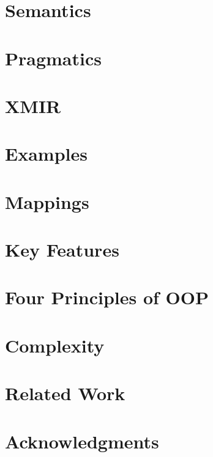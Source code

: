 \documentclass[sigplan,nonacm,natbib=false]{acmart}
\theoremstyle{theorems}
\begin{document}
\section{Semantics}
\label{sec:semantics}


\section{Pragmatics}
\label{sec:pragmatics}


\section{XMIR}
\label{sec:xmir}


\section{Examples}
\label{sec:examples}


\section{Mappings}
\label{sec:mappings}


\section{Key Features}
\label{sec:features}


\section{Four Principles of OOP}
\label{sec:four}


\section{Complexity}
\label{sec:complexity}


\section{Related Work}
\label{sec:related}


\section{Acknowledgments}


\printbibliography

\clearpage
\end{document}
